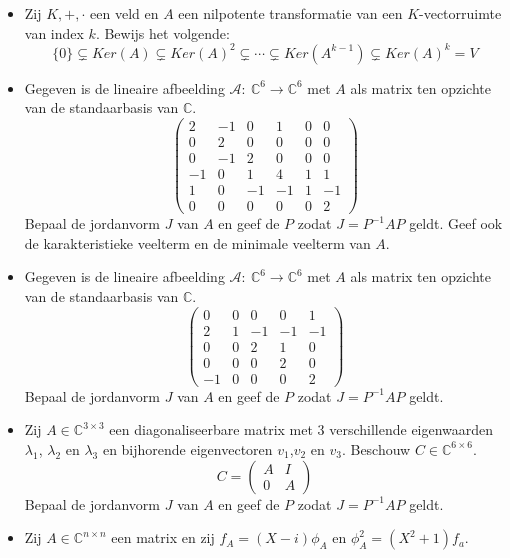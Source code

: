 \documentclass[main.tex]{subfiles}
\begin{document}
\begin{itemize}
\item Zij $K,+,\cdot$ een veld en $A$ een nilpotente transformatie van een $K$-vectorruimte van index $k$.
  Bewijs het volgende:
  \[ \{0\} \subsetneq Ker(A) \subsetneq Ker(A)^{2} \subsetneq \dotsb \subsetneq Ker(A^{k-1}) \subsetneq Ker(A)^{k} = V \]
\item Gegeven is de lineaire afbeelding $\mathcal{A}:\ \mathbb{C}^{6} \rightarrow \mathbb{C}^{6}$ met $A$ als matrix ten opzichte van de standaarbasis van $\mathbb{C}$.
  \[
  \begin{pmatrix}
    2 & -1 & 0 & 1 & 0 & 0\\
    0 & 2 & 0 & 0 & 0 & 0\\
    0 & -1 & 2 & 0 & 0 & 0\\
    -1 & 0 & 1 & 4 & 1 & 1\\
    1 & 0 & -1 & -1 & 1 & -1\\
     0 & 0 & 0 & 0 & 0 & 2
  \end{pmatrix}
  \]
  Bepaal de jordanvorm $J$ van $A$ en geef de $P$ zodat $J=P^{-1}AP$ geldt.
  Geef ook de karakteristieke veelterm en de minimale veelterm van $A$.
\item Gegeven is de lineaire afbeelding $\mathcal{A}:\ \mathbb{C}^{6} \rightarrow \mathbb{C}^{6}$ met $A$ als matrix ten opzichte van de standaarbasis van $\mathbb{C}$.
  \[
  \begin{pmatrix}
      0 & 0 & 0 & 0 & 1\\
      2 & 1 & -1 & -1 & -1\\
      0 & 0 & 2 & 1 &0\\
      0 & 0 & 0 & 2 & 0\\
      -1 & 0 & 0 & 0 & 2
  \end{pmatrix}
  \]
  Bepaal de jordanvorm $J$ van $A$ en geef de $P$ zodat $J=P^{-1}AP$ geldt.
\item Zij $A\in \mathbb{C}^{3\times 3}$ een diagonaliseerbare matrix met $3$ verschillende eigenwaarden $\lambda_{1}$, $\lambda_{2}$ en $\lambda_{3}$ en bijhorende eigenvectoren $v_{1}$,$v_{2}$ en $v_{3}$.
  Beschouw $C \in \mathbb{C}^{6\times 6}$.
  \[ C =
  \begin{pmatrix}
    A & I \\
    0 & A
  \end{pmatrix}
  \]
  Bepaal de jordanvorm $J$ van $A$ en geef de $P$ zodat $J=P^{-1}AP$ geldt.
\item Zij $A\in \mathbb{C}^{n \times n}$ een matrix en zij $f_{A} = (X-i)\phi_{A}$ en $\phi_{A}^{2} = (X^{2}+1)f_{a}$.

\end{itemize}
\end{document}
